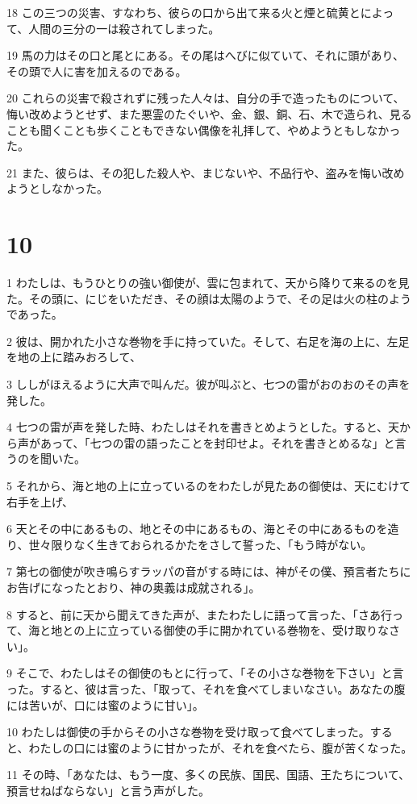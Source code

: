 \par 18 この三つの災害、すなわち、彼らの口から出て来る火と煙と硫黄とによって、人間の三分の一は殺されてしまった。
\par 19 馬の力はその口と尾とにある。その尾はへびに似ていて、それに頭があり、その頭で人に害を加えるのである。
\par 20 これらの災害で殺されずに残った人々は、自分の手で造ったものについて、悔い改めようとせず、また悪霊のたぐいや、金、銀、銅、石、木で造られ、見ることも聞くことも歩くこともできない偶像を礼拝して、やめようともしなかった。
\par 21 また、彼らは、その犯した殺人や、まじないや、不品行や、盗みを悔い改めようとしなかった。

\chapter{10}

\par 1 わたしは、もうひとりの強い御使が、雲に包まれて、天から降りて来るのを見た。その頭に、にじをいただき、その顔は太陽のようで、その足は火の柱のようであった。
\par 2 彼は、開かれた小さな巻物を手に持っていた。そして、右足を海の上に、左足を地の上に踏みおろして、
\par 3 ししがほえるように大声で叫んだ。彼が叫ぶと、七つの雷がおのおのその声を発した。
\par 4 七つの雷が声を発した時、わたしはそれを書きとめようとした。すると、天から声があって、「七つの雷の語ったことを封印せよ。それを書きとめるな」と言うのを聞いた。
\par 5 それから、海と地の上に立っているのをわたしが見たあの御使は、天にむけて右手を上げ、
\par 6 天とその中にあるもの、地とその中にあるもの、海とその中にあるものを造り、世々限りなく生きておられるかたをさして誓った、「もう時がない。
\par 7 第七の御使が吹き鳴らすラッパの音がする時には、神がその僕、預言者たちにお告げになったとおり、神の奥義は成就される」。
\par 8 すると、前に天から聞えてきた声が、またわたしに語って言った、「さあ行って、海と地との上に立っている御使の手に開かれている巻物を、受け取りなさい」。
\par 9 そこで、わたしはその御使のもとに行って、「その小さな巻物を下さい」と言った。すると、彼は言った、「取って、それを食べてしまいなさい。あなたの腹には苦いが、口には蜜のように甘い」。
\par 10 わたしは御使の手からその小さな巻物を受け取って食べてしまった。すると、わたしの口には蜜のように甘かったが、それを食べたら、腹が苦くなった。
\par 11 その時、「あなたは、もう一度、多くの民族、国民、国語、王たちについて、預言せねばならない」と言う声がした。


